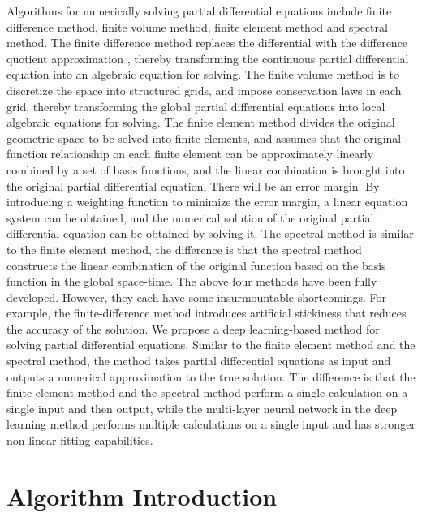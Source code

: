 \documentclass[10pt,journal,compsoc]{IEEEtran}
\begin{document}
Algorithms for numerically solving partial differential equations include finite difference method, finite volume method, finite element method and spectral method. The finite difference method replaces the differential with the difference quotient approximation \cite{LuJinfu2004}, thereby transforming the continuous partial differential equation into an algebraic equation for solving. The finite volume method is to discretize the space into structured grids\cite{LuJinfu2004}, and impose conservation laws in each grid, thereby transforming the global partial differential equations into local algebraic equations for solving. The finite element method divides the original geometric space to be solved into finite elements, and assumes that the original function relationship on each finite element can be approximately linearly combined by a set of basis functions, and the linear combination is brought into the original partial differential equation, There will be an error margin. By introducing a weighting function to minimize the error margin, a linear equation system can be obtained, and the numerical solution of the original partial differential equation can be obtained by solving it\cite{kopriva2009}. The spectral method is similar to the finite element method, the difference is that the spectral method constructs the linear combination of the original function based on the basis function in the global space-time\cite{wang2017}. The above four methods have been fully developed. However, they each have some insurmountable shortcomings. For example, the finite-difference method introduces artificial stickiness that reduces the accuracy of the solution.
We propose a deep learning-based method for solving partial differential equations. Similar to the finite element method and the spectral method, the method takes partial differential equations as input and outputs a numerical approximation to the true solution. The difference is that the finite element method and the spectral method perform a single calculation on a single input and then output, while the multi-layer neural network in the deep learning method performs multiple calculations on a single input and has stronger non-linear fitting capabilities.






\section{Algorithm Introduction}
\end{document}
